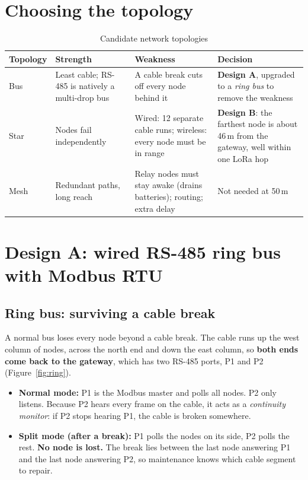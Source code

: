 \documentclass[11pt,a4paper]{report}
\begin{document}
\section{Choosing the topology}
\begin{table}[htbp]
\centering
\caption{Candidate network topologies}\label{tab:topo}
\small
\begin{tabularx}{\textwidth}{>{\raggedright\arraybackslash}p{1.9cm} Y Y Y}
\toprule
\textbf{Topology} & \textbf{Strength} & \textbf{Weakness} & \textbf{Decision}\\
\midrule
Bus & Least cable; RS-485 is natively a multi-drop bus & A cable break cuts off every node behind it & \textbf{Design A}, upgraded to a \emph{ring bus} to remove the weakness\\
Star & Nodes fail independently & Wired: 12 separate cable runs; wireless: every node must be in range & \textbf{Design B}: the farthest node is about 46\,m from the gateway, well within one LoRa hop\\
Mesh & Redundant paths, long reach & Relay nodes must stay awake (drains batteries); routing; extra delay & Not needed at 50\,m\\
\bottomrule
\end{tabularx}
\end{table}

\section{Design A: wired RS-485 ring bus with Modbus RTU}
\subsection{Ring bus: surviving a cable break}\label{sec:ring}
A normal bus loses every node beyond a cable break. The cable runs up the west column of nodes, across the north end and down the east column, so \textbf{both ends come back to the gateway}, which has two RS-485 ports, P1 and P2 (Figure~\ref{fig:ring}).
\begin{itemize}
  \item \textbf{Normal mode:} P1 is the Modbus master and polls all nodes. P2 only listens. Because P2 hears every frame on the cable, it acts as a \emph{continuity monitor}: if P2 stops hearing P1, the cable is broken somewhere.
  \item \textbf{Split mode (after a break):} P1 polls the nodes on its side, P2 polls the rest. \textbf{No node is lost.} The break lies between the last node answering P1 and the last node answering P2, so maintenance knows which cable segment to repair.
\end{itemize}
\end{document}
